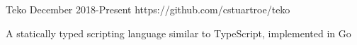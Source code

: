 

\begin{cventries}

  \projectentry
    {Teko}
    {December 2018-Present}
    {https://github.com/cstuartroe/teko}
    {
      \begin{cvitems}
        \item {
          A statically typed scripting language similar to TypeScript, implemented in Go
        }
      \end{cvitems}
    }

\end{cventries}
